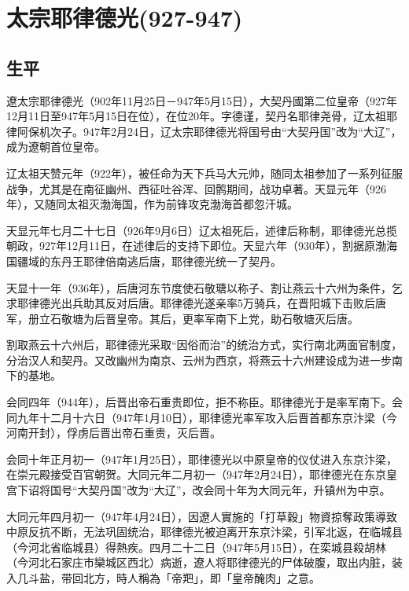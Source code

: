 
\section{太宗耶律德光\tiny(927-947)}

\subsection{生平}

遼太宗耶律德光（902年11月25日－947年5月15日），大契丹國第二位皇帝（927年12月11日至947年5月15日在位），在位20年。字德谨，契丹名耶律尧骨，辽太祖耶律阿保机次子。947年2月24日，辽太宗耶律德光将国号由“大契丹国”改为“大辽”，成为遼朝首位皇帝。

辽太祖天赞元年（922年），被任命为天下兵马大元帅，随同太祖参加了一系列征服战争，尤其是在南征幽州、西征吐谷浑、回鹘期间，战功卓著。天显元年（926年），又随同太祖灭渤海国，作为前锋攻克渤海首都忽汗城。

天显元年七月二十七日（926年9月6日）辽太祖死后，述律后称制，耶律德光总揽朝政，927年12月11日，在述律后的支持下即位。天显六年（930年），割据原渤海国疆域的东丹王耶律倍南逃后唐，耶律德光统一了契丹。

天显十一年（936年），后唐河东节度使石敬瑭以称子、割让燕云十六州为条件，乞求耶律德光出兵助其反对后唐。耶律德光遂亲率5万骑兵，在晋阳城下击败后唐军，册立石敬塘为后晋皇帝。其后，更率军南下上党，助石敬塘灭后唐。

割取燕云十六州后，耶律德光采取“因俗而治”的统治方式，实行南北两面官制度，分治汉人和契丹。又改幽州为南京、云州为西京，将燕云十六州建设成为进一步南下的基地。

会同四年（944年），后晋出帝石重贵即位，拒不称臣。耶律德光于是率军南下。会同九年十二月十六日（947年1月10日），耶律德光率军攻入后晋首都东京汴梁（今河南开封），俘虏后晋出帝石重贵，灭后晋。

会同十年正月初一（947年1月25日），耶律德光以中原皇帝的仪仗进入东京汴梁，在崇元殿接受百官朝贺。大同元年二月初一（947年2月24日），耶律德光在东京皇宫下诏将国号“大契丹国”改为“大辽”，改会同十年为大同元年，升镇州为中京。

大同元年四月初一（947年4月24日），因遼人實施的「打草穀」物資掠奪政策導致中原反抗不断，无法巩固统治，耶律德光被迫离开东京汴梁，引军北返，在临城县（今河北省临城县）得熱疾。四月二十二日（947年5月15日），在栾城县殺胡林（今河北石家庄市欒城区西北）病逝，遼人将耶律德光的尸体破腹，取出内脏，装入几斗盐，带回北方，時人稱為「帝羓」，即「皇帝醃肉」之意。

